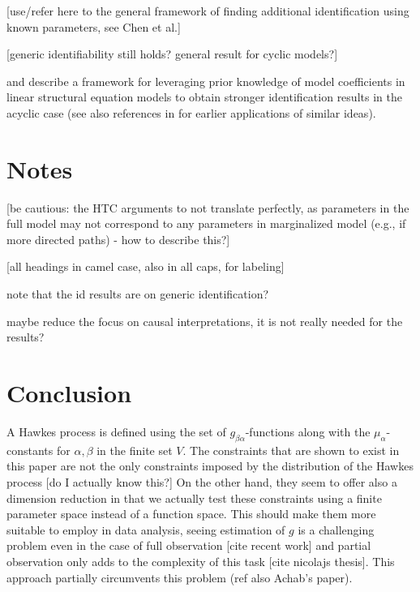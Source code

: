 \documentclass[accepted]{uai2021} %
\begin{document}
[use/refer here to the general framework of finding additional identification 
using known parameters, see Chen et al.]

[generic identifiability still holds? general result for cyclic models?]

\cite{chenIJCAI2016} and \cite{chenICML2017} describe a framework for 
leveraging prior knowledge of 
model coefficients in linear structural equation models to obtain stronger 
identification results in the acyclic case (see also references in 
\cite{chenICML2017} for earlier applications of similar ideas).


\section{Notes}

[be cautious: the HTC arguments to not translate perfectly, as parameters in 
the full model may not correspond to any parameters in marginalized model 
(e.g., if more directed paths) - how to describe this?]

[all headings in camel case, also in all caps, for labeling]

note that the id results are on generic identification?

maybe reduce the focus on causal interpretations, it is not really needed for 
the results?


\section{Conclusion}

A Hawkes process is defined using the set of $g_{\beta\alpha}$-functions along 
with the $\mu_\alpha$-constants for $\alpha,\beta$ in the finite set $V$. The 
constraints that are shown to exist in this paper are not the only constraints 
imposed by the distribution of the Hawkes process [do I actually know this?] On 
the other hand, they seem to offer also a dimension reduction in that we 
actually test these constraints using a finite parameter space instead of a 
function space. This should make them more suitable to employ in data analysis, 
seeing estimation of $g$ is a challenging problem even in the case of full 
observation [cite recent work] and partial observation only adds to the 
complexity of this task [cite nicolajs thesis]. This approach partially 
circumvents this problem (ref also Achab's paper).
\end{document}
